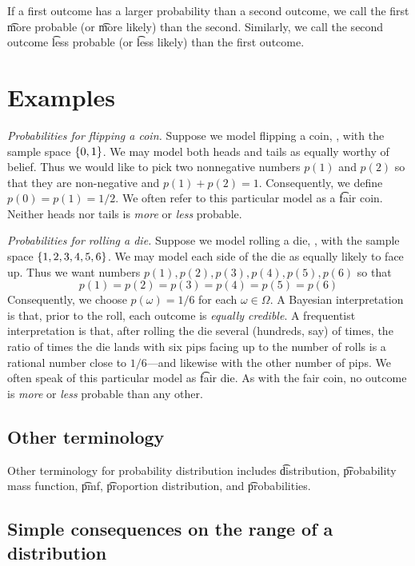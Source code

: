 If a first outcome has a larger probability than a second outcome, we call the first \t{more probable} (or \t{more likely}) than the second.
Similarly, we call the second outcome \t{less probable} (or \t{less likely}) than the first outcome.

\section*{Examples}

\textit{Probabilities for flipping a coin.}
Suppose we model flipping a coin, , with the sample space $\{0,1\}$.
We may model both heads and tails as equally worthy of belief.
Thus we would like to pick two nonnegative numbers $p(1)$ and $p(2)$ so that they are non-negative and $p(1) + p(2) = 1$.
Consequently, we define $p(0) = p(1) = 1/2 $.
We often refer to this particular model as a \t{fair coin}.
Neither heads nor tails is \textit{more} or \textit{less} probable.

\textit{Probabilities for rolling a die.}
Suppose we model rolling a die, , with the sample space $\{1, 2, 3, 4, 5, 6\}$.
We may model each side of the die as equally likely to face up.
Thus we want numbers $p(1), p(2), p(3), p(4), p(5), p(6)$ so that
\[
p(1) = p(2) = p(3) = p(4) = p(5) = p(6)
\]
Consequently, we choose $p(\omega ) = 1/6$ for each $\omega  \in \Omega $.
A Bayesian interpretation is that, prior to the roll, each outcome is \textit{equally credible}.
A frequentist interpretation is that, after rolling the die several (hundreds, say) of times, the ratio of times the die lands with six pips facing up to the number of rolls is a rational number close to $1/6$---and likewise with the other number of pips.
We often speak of this particular model as \t{fair die}.
As with the fair coin, no outcome is \textit{more} or \textit{less} probable than any other.

\subsection*{Other terminology}

Other terminology for probability distribution includes \t{distribution}, \t{probability mass function}, \t{pmf}, \t{proportion distribution}, and \t{probabilities}.
\subsection*{Simple consequences on the range of a distribution}

